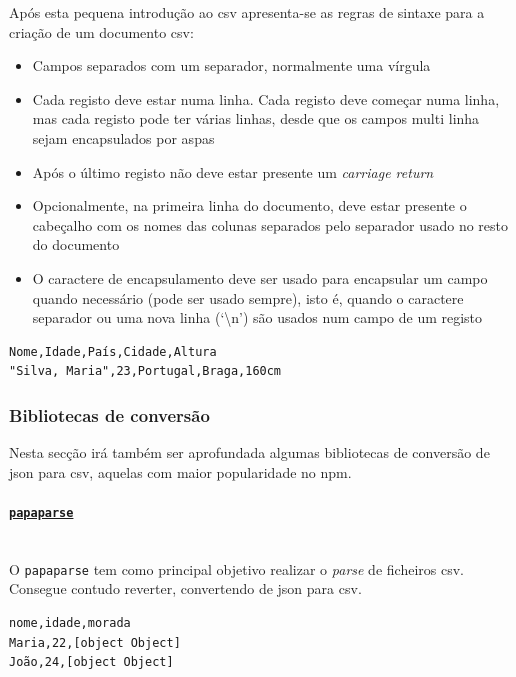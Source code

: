 Após esta pequena introdução ao \acrshort{csv} apresenta-se as regras de sintaxe para a criação de um documento \acrshort{csv}:
\begin{itemize}
    \item Campos separados com um separador, normalmente uma vírgula
    \item Cada registo deve estar numa linha. Cada registo deve começar numa linha, mas cada registo pode ter várias linhas, desde que os campos multi linha sejam encapsulados por aspas
    \item Após o último registo não deve estar presente um \textit{carriage return}
    \item Opcionalmente, na primeira linha do documento, deve estar presente o cabeçalho com os nomes das colunas separados pelo separador usado no resto do documento
    \item O caractere de encapsulamento deve ser usado para encapsular um campo quando necessário (pode ser usado sempre), isto é, quando o caractere separador ou uma nova linha (`\backslash{}n') são usados num campo de um registo
\end{itemize}

\begin{lstlisting}[caption=Pequeno exemplo em \acrshort{csv}, label=exem:csvEx]
Nome,Idade,País,Cidade,Altura
"Silva, Maria",23,Portugal,Braga,160cm
\end{lstlisting}

\subsubsection{Bibliotecas de conversão}

Nesta secção irá também ser aprofundada algumas bibliotecas de conversão de \acrshort{json} para \acrshort{csv}, aquelas com maior popularidade no \acrshort{npm}.

\paragraph{\href{https://www.npmjs.com/package/papaparse}{\texttt{papaparse}}} \mbox{} \\

O \texttt{papaparse} tem como principal objetivo realizar o \textit{parse} de ficheiros \acrshort{csv}. Consegue contudo reverter, convertendo de \acrshort{json} para \acrshort{csv}.

\begin{lstlisting}[caption=Resultado da conversão do exemplo~\ref{exem:jsonBib} usando o conversor \texttt{papaparse}, label=exem:papaparse]
nome,idade,morada
Maria,22,[object Object]
João,24,[object Object]
\end{lstlisting}

